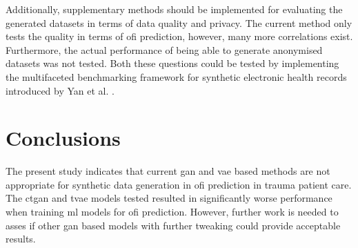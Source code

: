 \documentclass[12pt, a4paper]{article}
\begin{document}
Additionally, supplementary methods should be implemented for evaluating the generated datasets in terms of data quality and privacy. The current method only tests the quality in terms of \acrshort{ofi} prediction, however, many more correlations exist. Furthermore, the actual performance of being able to generate anonymised datasets was not tested. Both these questions could be tested by implementing the multifaceted benchmarking framework for synthetic electronic health records introduced by Yan et al. \cite{yan_multifaceted_2022}.


\section{Conclusions}
The present study indicates that current \acrshort{gan} and \acrshort{vae} based methods are not appropriate for synthetic data generation in \acrshort{ofi} prediction in trauma patient care. The \acrshort{ctgan} and \acrshort{tvae} models tested resulted in significantly worse performance when training \acrshort{ml} models for \acrshort{ofi} prediction. However, further work is needed to asses if other \acrshort{gan} based models with further tweaking could provide acceptable results.

\newpage

\singlespacing

\printbibliography

\newpage
\end{document}
